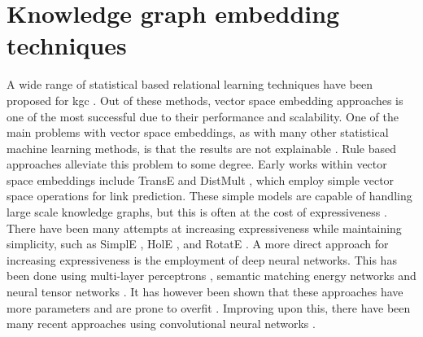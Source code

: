 \section{Knowledge graph embedding techniques}
A wide range of statistical based relational learning techniques have been proposed for \gls{kgc} \cite{nickel2015review}. Out of these methods, vector space embedding approaches is one of the most successful due to their performance and scalability. One of the main problems with vector space embeddings, as with many other statistical machine learning methods, is that the results are not explainable \cite{bonatti2019knowledge}. Rule based approaches alleviate this problem to some degree. Early works within vector space embeddings include TransE \cite{TransE} and DistMult \cite{yang2014embedding}, which employ simple vector space operations for link prediction. These simple models are capable of handling large scale knowledge graphs, but this is often at the cost of expressiveness \cite{dettmers2018convolutional}. There have been many attempts at increasing expressiveness while maintaining simplicity, such as SimplE \cite{SimplE}, HolE \cite{holE}, and RotatE \cite{rotatE}. A more direct approach for increasing expressiveness is the employment of deep neural networks. This has been done using multi-layer perceptrons \cite{dong2014knowledge}, semantic matching energy networks \cite{bordes2014semantic} and neural tensor networks \cite{socher2013reasoning}. It has however been shown that these approaches have more parameters and are prone to overfit \cite{nickel2015review}. Improving upon this, there have been many recent approaches using convolutional neural networks \cite{dettmers2018convolutional, nguyen2017novel, schlichtkrull2018modeling, vashishth2019composition} .


